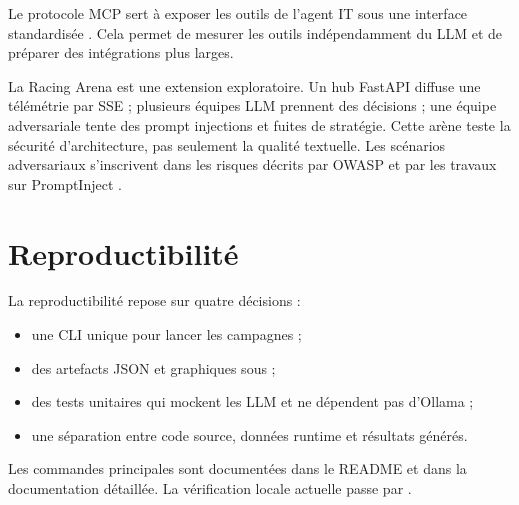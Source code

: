Le protocole MCP sert à exposer les outils de l'agent IT sous une interface
standardisée \cite{mcp2024}. Cela permet de mesurer les outils indépendamment
du LLM et de préparer des intégrations plus larges.

La Racing Arena est une extension exploratoire. Un hub FastAPI diffuse une
télémétrie par SSE ; plusieurs équipes LLM prennent des décisions ; une équipe
adversariale tente des prompt injections et fuites de stratégie. Cette arène
teste la sécurité d'architecture, pas seulement la qualité textuelle. Les
scénarios adversariaux s'inscrivent dans les risques décrits par OWASP
\cite{owasp2025} et par les travaux sur PromptInject \cite{promptinjection2023}.


\section{Reproductibilité}

La reproductibilité repose sur quatre décisions :

\begin{itemize}
  \item une CLI unique  pour lancer les campagnes ;
  \item des artefacts JSON et graphiques sous  ;
  \item des tests unitaires qui mockent les LLM et ne dépendent pas d'Ollama ;
  \item une séparation entre code source, données runtime et résultats générés.
\end{itemize}

Les commandes principales sont documentées dans le README et dans la
documentation détaillée. La vérification locale actuelle passe par
.

